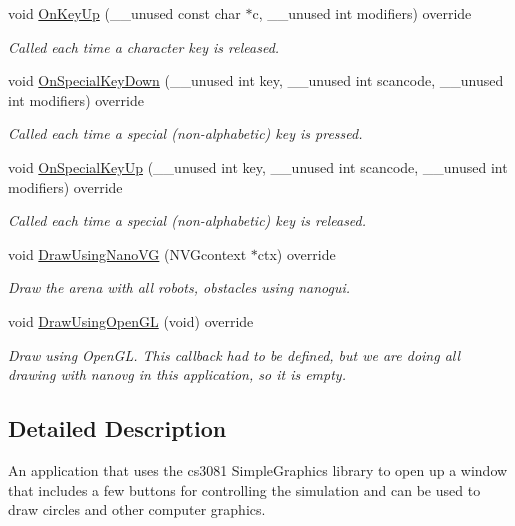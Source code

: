 \begin{DoxyCompactItemize}
void \hyperlink{classRobotViewer_a7607dc80b550f1e1f2d88cccb21fe6af}{On\+Key\+Up} (\+\_\+\+\_\+unused const char $\ast$c, \+\_\+\+\_\+unused int modifiers) override
\begin{DoxyCompactList}\small\item\em Called each time a character key is released. \end{DoxyCompactList}\item 
void \hyperlink{classRobotViewer_a76911b260748dc4b4d5187fd85e23b71}{On\+Special\+Key\+Down} (\+\_\+\+\_\+unused int key, \+\_\+\+\_\+unused int scancode, \+\_\+\+\_\+unused int modifiers) override
\begin{DoxyCompactList}\small\item\em Called each time a special (non-\/alphabetic) key is pressed. \end{DoxyCompactList}\item 
void \hyperlink{classRobotViewer_a4d81343908c8e2ef4e48c6320b52ffdd}{On\+Special\+Key\+Up} (\+\_\+\+\_\+unused int key, \+\_\+\+\_\+unused int scancode, \+\_\+\+\_\+unused int modifiers) override
\begin{DoxyCompactList}\small\item\em Called each time a special (non-\/alphabetic) key is released. \end{DoxyCompactList}\item 
void \hyperlink{classRobotViewer_ac67e2c6bc6f4ddc6c50d4c7e05d99662}{Draw\+Using\+Nano\+VG} (N\+V\+Gcontext $\ast$ctx) override
\begin{DoxyCompactList}\small\item\em Draw the arena with all robots, obstacles using nanogui. \end{DoxyCompactList}\item 
void \hyperlink{classRobotViewer_accb905122b66ed5a084c77b078216083}{Draw\+Using\+Open\+GL} (void) override\hypertarget{classRobotViewer_accb905122b66ed5a084c77b078216083}{}\label{classRobotViewer_accb905122b66ed5a084c77b078216083}

\begin{DoxyCompactList}\small\item\em Draw using Open\+GL. This callback had to be defined, but we are doing all drawing with nanovg in this application, so it is empty. \end{DoxyCompactList}\end{DoxyCompactItemize}


\subsection{Detailed Description}
An application that uses the cs3081 Simple\+Graphics library to open up a window that includes a few buttons for controlling the simulation and can be used to draw circles and other computer graphics. 

